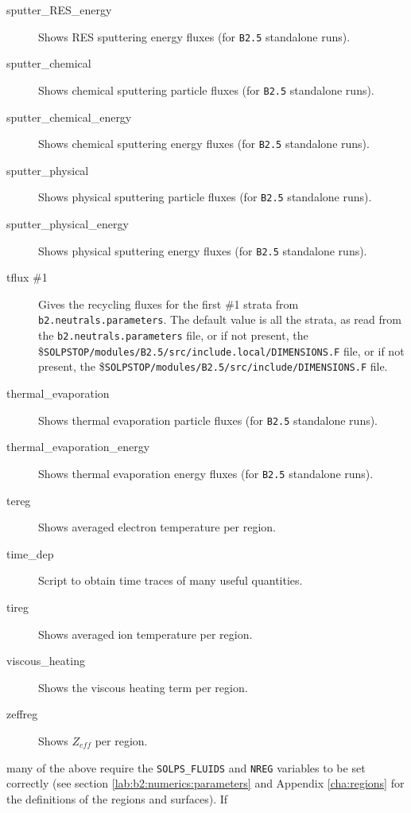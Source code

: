 \documentclass[a4paper,10pt]{report}
\begin{document}
\begin{itemize}
\begin{description}
  \item[sputter\_RES\_energy] Shows RES sputtering energy fluxes (for {\tt B2.5} standalone runs).
  \item[sputter\_chemical] Shows chemical sputtering particle fluxes (for {\tt B2.5} standalone runs).
  \item[sputter\_chemical\_energy] Shows chemical sputtering energy fluxes (for {\tt B2.5} standalone runs).
  \item[sputter\_physical] Shows physical sputtering particle fluxes (for {\tt B2.5} standalone runs).
  \item[sputter\_physical\_energy] Shows physical sputtering energy fluxes (for {\tt B2.5} standalone runs).
  \item[tflux \#1] Gives the recycling fluxes for the first \#1 strata from {\tt b2.neutrals.parameters}. The default value is all the strata, as read from the {\tt b2.neutrals.parameters} file, or if not present, the \${\tt SOLPSTOP\allowbreak/modules/B2.5/src/include.local/DIMENSIONS.F} file, or if not present, the \${\tt SOLPSTOP\allowbreak/modules/B2.5/src/include/DIMENSIONS.F} file.
  \item[thermal\_evaporation] Shows thermal evaporation particle fluxes (for {\tt B2.5} standalone runs).
  \item[thermal\_evaporation\_energy] Shows thermal evaporation energy fluxes (for {\tt B2.5} standalone runs).
  \item[tereg] Shows averaged electron temperature per region.
  \item[time\_dep] Script to obtain time traces of many useful quantities.
  \item[tireg] Shows averaged ion temperature per region.
  \item[viscous\_heating] Shows the viscous heating term per region.
  \item[zeffreg] Shows $Z_{eff}$ per region.
  \end{description}
many of the above require the {\tt SOLPS\_FLUIDS} and {\tt NREG} variables to be set
correctly (see section \ref{lab:b2:numerics:parameters} and Appendix \ref{cha:regions}
for the definitions of the regions and surfaces). If

\end{itemize}
\end{document}
